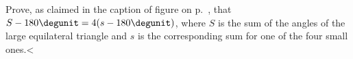 Prove, as claimed in the caption of figure 
on p.~\pageref{fig:angular-defect-propto-area},
that $S-180\degunit=4(s-180\degunit)$, where $S$ is the
sum of the angles of the large equilateral triangle and $s$
is the corresponding sum for one of the four small ones.<%
